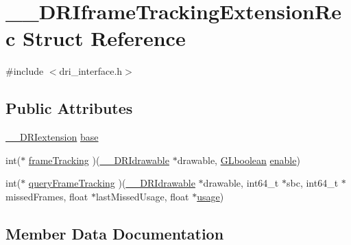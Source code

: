 \hypertarget{struct_____d_r_iframe_tracking_extension_rec}{}\section{\+\_\+\+\_\+\+D\+R\+Iframe\+Tracking\+Extension\+Rec Struct Reference}
\label{struct_____d_r_iframe_tracking_extension_rec}


{\ttfamily \#include $<$dri\+\_\+interface.\+h$>$}

\subsection*{Public Attributes}
\begin{DoxyCompactItemize}
\item 
\hyperlink{dri__interface_8h_a4e0a61c8ece00d2b2c6792a9a1b55385}{\+\_\+\+\_\+\+D\+R\+Iextension} \hyperlink{struct_____d_r_iframe_tracking_extension_rec_af01dbdf8b0011437192aed241ef2b420}{base}
\item 
int($\ast$ \hyperlink{struct_____d_r_iframe_tracking_extension_rec_adccd7dad9d1b661424073213d67af7f6}{frame\+Tracking} )(\hyperlink{dri__interface_8h_a5bfb832a0a08208d95b3bbef439d2262}{\+\_\+\+\_\+\+D\+R\+Idrawable} $\ast$drawable, \hyperlink{gl_8h_aea1419aa8aec5854bd9807b45171029d}{G\+Lboolean} \hyperlink{glext_8h_ab0b5c7de20095d30091485d2c60a3dd5}{enable})
\item 
int($\ast$ \hyperlink{struct_____d_r_iframe_tracking_extension_rec_aceab750acd6bc8afdd5315d39537a3c2}{query\+Frame\+Tracking} )(\hyperlink{dri__interface_8h_a5bfb832a0a08208d95b3bbef439d2262}{\+\_\+\+\_\+\+D\+R\+Idrawable} $\ast$drawable, int64\+\_\+t $\ast$sbc, int64\+\_\+t $\ast$missed\+Frames, float $\ast$last\+Missed\+Usage, float $\ast$\hyperlink{glcorearb_8h_afb85c5d9b1bce96aa3b530d581194d1a}{usage})
\end{DoxyCompactItemize}


\subsection{Member Data Documentation}
\mbox{\label{struct_____d_r_iframe_tracking_extension_rec_af01dbdf8b0011437192aed241ef2b420}} 

